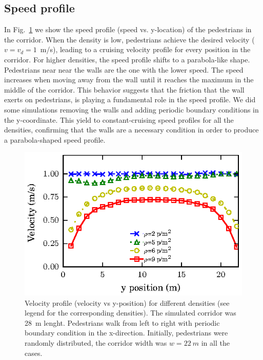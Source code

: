 \subsection{Speed profile}

In Fig.~\ref{speed-profile-w22} we show the speed profile (speed vs. y-location) of the pedestrians in the  corridor. When the density is low, pedestrians achieve the desired velocity ($v=v_d=1$~m/s), leading to a cruising velocity profile for every position in the corridor. For higher densities, the speed profile shifts to a parabola-like shape. Pedestrians near near the walls are the one with the lower speed. The speed increases when moving away from the wall until it reaches the maximum in the middle of the corridor. This behavior suggests that the friction that the wall exerts on pedestrians, is playing a fundamental role in the speed profile. We did some simulations removing the walls and adding periodic boundary conditions in the y-coordinate. This yield to constant-cruising speed profiles for all the densities, confirming that the walls are a necessary condition in order to produce a parabola-shaped speed profile.



\begin{figure}[htbp!]
\includegraphics[width=\columnwidth]
{plots/v(y)_width22_k24.eps}
\caption{\label{speed-profile-w22} Velocity profile (velocity vs y-position) for different densities (see legend for the corresponding densities). The simulated corridor was 28~m lenght. Pedestrians walk from left to right with periodic boundary condition in the x-direction. Initially, pedestrians were randomly distributed, the corridor width was $w = 22~m$ in all the cases. }
\end{figure}

